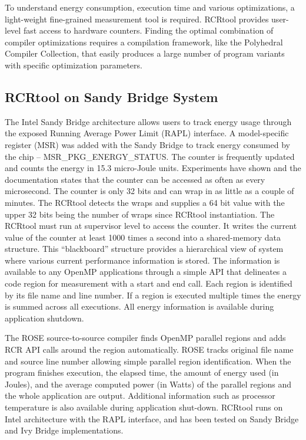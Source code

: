 To understand energy consumption, execution time and various optimizations,
a light-weight fine-grained measurement tool is required. RCRtool provides 
user-level fast access to hardware counters.
Finding the optimal combination of compiler optimizations 
requires a compilation framework, like the Polyhedral Compiler
Collection, that easily produces a large number of 
program variants with specific optimization parameters.

\subsection{RCRtool on Sandy Bridge System}
The Intel Sandy Bridge architecture allows users to track energy usage through 
the exposed Running Average Power Limit (RAPL) interface. 
A model-specific register (MSR) was added with the Sandy Bridge to track energy
consumed by the chip  -- MSR\_PKG\_ENERGY\_STATUS.
The counter is frequently updated and counts the energy in 15.3 micro-Joule units.
Experiments have shown\cite{us} and the documentation\cite{IntelSystemProgrammingVol3} states
that the counter can be accessed as often as every microsecond. 
The counter is only 32 bits and can wrap in as little as a couple of minutes.
The RCRtool detects the wraps and supplies a 64 bit value with the 
upper 32 bits being the number of wraps since RCRtool instantiation.
The RCRtool must run at supervisor level to access the counter.
It writes the current value of the counter at least 1000 times a second into a shared-memory
data structure. This ``blackboard'' structure provides a hierarchical view of system
where various current performance information is stored. The 
information is available to any OpenMP applications through a simple API that 
delineates a code region for measurement with a start and end call.
Each region is identified by its file name and line number.
If a region is executed multiple times the energy is summed across all executions. 
All energy information is available during application shutdown.

The ROSE source-to-source compiler\cite{ROSE} 
finds OpenMP parallel regions and adds RCR API calls around the region 
automatically. ROSE tracks original file name and source line
number allowing simple parallel region identification. When the program finishes execution,
the elapsed time, the amount of energy used (in Joules), and the average computed
power (in Watts) of the parallel regions and the whole application are output. 
Additional information such as processor temperature is also available 
during application shut-down.
RCRtool runs on Intel architecture with the RAPL interface, and has been tested
on Sandy Bridge and Ivy Bridge implementations.

